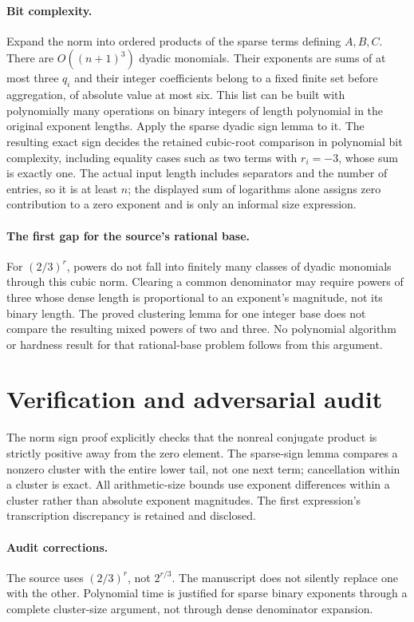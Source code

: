 \documentclass[11pt]{article}
\begin{document}
\paragraph{Bit complexity.}
Expand the norm into ordered products of the sparse terms defining $A,B,C$. There are $O((n+1)^3)$ dyadic monomials. Their exponents are sums of at most three $q_i$ and their integer coefficients belong to a fixed finite set before aggregation, of absolute value at most six. This list can be built with polynomially many operations on binary integers of length polynomial in the original exponent lengths. Apply the sparse dyadic sign lemma to it. The resulting exact sign decides the retained cubic-root comparison in polynomial bit complexity, including equality cases such as two terms with $r_i=-3$, whose sum is exactly one. The actual input length includes separators and the number of entries, so it is at least $n$; the displayed sum of logarithms alone assigns zero contribution to a zero exponent and is only an informal size expression.

\paragraph{The first gap for the source's rational base.}
For $(2/3)^r$, powers do not fall into finitely many classes of dyadic monomials through this cubic norm. Clearing a common denominator may require powers of three whose dense length is proportional to an exponent's magnitude, not its binary length. The proved clustering lemma for one integer base does not compare the resulting mixed powers of two and three. No polynomial algorithm or hardness result for that rational-base problem follows from this argument.
\section{Verification and adversarial audit}
The norm sign proof explicitly checks that the nonreal conjugate product is strictly positive away from the zero element. The sparse-sign lemma compares a nonzero cluster with the entire lower tail, not one next term; cancellation within a cluster is exact. All arithmetic-size bounds use exponent differences within a cluster rather than absolute exponent magnitudes. The first expression's transcription discrepancy is retained and disclosed.
\paragraph{Audit corrections.} The source uses $(2/3)^r$, not $2^{r/3}$. The manuscript does not silently replace one with the other. Polynomial time is justified for sparse binary exponents through a complete cluster-size argument, not through dense denominator expansion.
\end{document}
